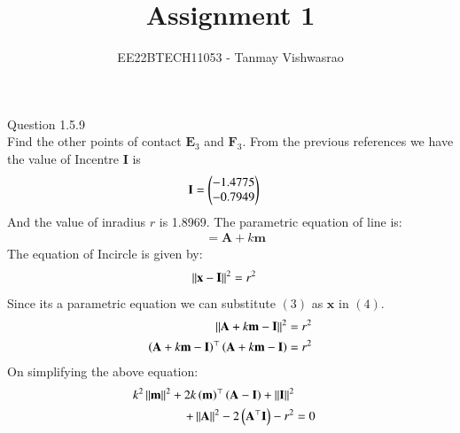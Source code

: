 \documentclass[journal,12pt,twocolumn]{IEEEtran}
\theoremstyle{remark}
\begin{document}
\let\vec\mathbf





\vspace{3cm}

\title{
Assignment 1
}
\author{ EE22BTECH11053 - Tanmay Vishwasrao%
	
}	

\maketitle

\newpage


\bigskip

\renewcommand{\thefigure}{\theenumi}
\renewcommand{\thetable}{\theenumi}
Question 1.5.9\\
Find the other points of contact $\vec{E}_3$ and $\vec{F}_3$.
\fi
\solution
From the previous references we have the value of Incentre $\vec{I}$ is
\begin{align}
\vec{I} &=\myvec{-1.4775\\-0.7949}
\end{align}
And the value of inradius $r$ is 1.8969. The parametric equation of line is:
\begin{align}
&= \vec{A}+k\vec{m}
\end{align}
The equation of Incircle is given by:
\begin{align}
\norm{\vec{x}-\vec{I}}^2 &= r^2
\end{align}
Since its a parametric equation we can substitute $(3)$ as $\vec{x}$ in $(4)$.
\begin{align}
\norm{\vec{A}+k\vec{m}-\vec{I}}^2 &= r^2 \\
\brak{\vec{A}+k\vec{m}-\vec{I}}^\top\brak{\vec{A}+k\vec{m}-\vec{I}} &= r^2
\end{align}
On simplifying the above equation:
\begin{align}
k^2\norm{\vec{m}}^2+2k\brak{\vec{m}}^\top\brak{\vec{A-I}}+\norm{\vec{I}}^2 \nonumber \\
+\norm{\vec{A}}^2-2\brak{\vec{A}^\top\vec{I}}-r^2 &= 0 \label{eq6}
\end{align}
\end{document}
